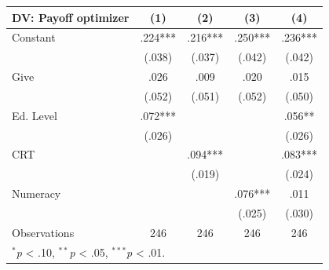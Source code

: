 \begingroup
\centering
\begin{tabular*}{\linewidth}{@{\extracolsep{\fill}}lcccc}
   \toprule
   DV: Payoff optimizer & \multicolumn{1}{c}{(1)} & \multicolumn{1}{c}{(2)} & \multicolumn{1}{c}{(3)} & \multicolumn{1}{c}{(4)}\\
   \midrule
   Constant & \mbox{\hphantom{8}.224***} & \mbox{\hphantom{8}.216***} & \mbox{\hphantom{8}.250***} & \mbox{\hphantom{8}.236***}\\
    & \mbox{(.038)\hphantom{88}} & \mbox{(.037)\hphantom{88}} & \mbox{(.042)\hphantom{88}} & \mbox{(.042)\hphantom{88}}\\
   Give & \mbox{\hphantom{8}.026\hphantom{888}} & \mbox{\hphantom{8}.009\hphantom{888}} & \mbox{\hphantom{8}.020\hphantom{888}} & \mbox{\hphantom{8}.015\hphantom{888}}\\
    & \mbox{(.052)\hphantom{88}} & \mbox{(.051)\hphantom{88}} & \mbox{(.052)\hphantom{88}} & \mbox{(.050)\hphantom{88}}\\
   Ed. Level & \mbox{\hphantom{8}.072***} &  &  & \mbox{\hphantom{8}.056**\hphantom{8}}\\
    & \mbox{(.026)\hphantom{88}} &  &  & \mbox{(.026)\hphantom{88}}\\
   CRT &  & \mbox{\hphantom{8}.094***} &  & \mbox{\hphantom{8}.083***}\\
    &  & \mbox{(.019)\hphantom{88}} &  & \mbox{(.024)\hphantom{88}}\\
   Numeracy &  &  & \mbox{\hphantom{8}.076***} & \mbox{\hphantom{8}.011\hphantom{888}}\\
    &  &  & \mbox{(.025)\hphantom{88}} & \mbox{(.030)\hphantom{88}}\\
   \midrule
   Observations & 246 & 246 & 246 & 246\\
   \multicolumn{5}{l}{\footnotesize $^{*}$\textit{p} < .10, $^{**}$\textit{p} < .05, $^{***}$\textit{p} < .01.}\\
   \bottomrule
\end{tabular*}
\par\endgroup
